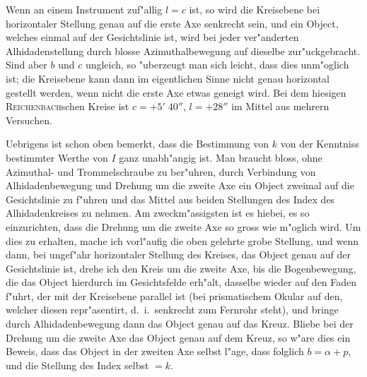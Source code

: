 \documentclass[12pt,a4paper]{article}
\begin{document}
Wenn an einem Instrument zuf"allig $l = c$ ist, so wird die Kreisebene bei horizontaler Stellung
genau auf die erste Axe senkrecht sein, und ein Object, welches einmal auf der Gesichtslinie ist, wird
bei jeder ver"anderten Alhidadenstellung durch blosse Azimuthalbewegung auf dieselbe zur"uckgebracht.
Sind aber $b$ und $c$ ungleich, so "uberzeugt man sich leicht, dass dies unm"oglich ist; die Kreisebene kann
dann im eigentlichen Sinne nicht genau horizontal gestellt werden, wenn nicht die erste Axe etwas geneigt
wird. Bei dem hiesigen \textsc{Reichenbach}schen Kreise ist $c = +5'\;40''$, $l = +28''$ im Mittel aus mehrern
Versuchen.

Uebrigens ist schon oben bemerkt, dass die Bestimmung von $k$ von der Kenntniss bestimmter
Werthe von $I$ ganz unabh"angig ist. Man braucht bloss, ohne Azimuthal- und Trommelschraube zu
ber"uhren, durch Verbindung von Alhidadenbewegung und Drehung um die zweite Axe ein Object zweimal
auf die Gesichtslinie zu f"uhren und das Mittel aus beiden Stellungen des Index des Alhidadenkreises zu
nehmen. Am zweckm"assigsten ist es hiebei, es so einzurichten, dass die Drehung um die zweite Axe so
gross wie m"oglich wird. Um dies zu erhalten, mache ich vorl"aufig die oben gelehrte grobe Stellung, und
wenn dann, bei ungef"ahr horizontaler Stellung des Kreises, das Object genau auf der Gesichtslinie ist,
drehe ich den Kreis um die zweite Axe, bis die Bogenbewegung, die das Object hierdurch im Gesichtsfelde
erh"alt, dasselbe wieder auf den Faden f"uhrt, der mit der Kreisebene parallel ist (bei prismatischem
Okular auf den, welcher diesen repr"asentirt, d.~i.~senkrecht zum Fernrohr steht), und bringe durch
Alhidadenbewegung dann das Object genau auf das Kreuz. Bliebe bei der Drehung um die zweite Axe
das Object genau auf dem Kreuz, so w"are dies ein Beweis, dass das Object in der zweiten Axe selbst
l"age, dass folglich $b = \alpha + p$, und die Stellung des Index selbst $= k$.
\end{document}
